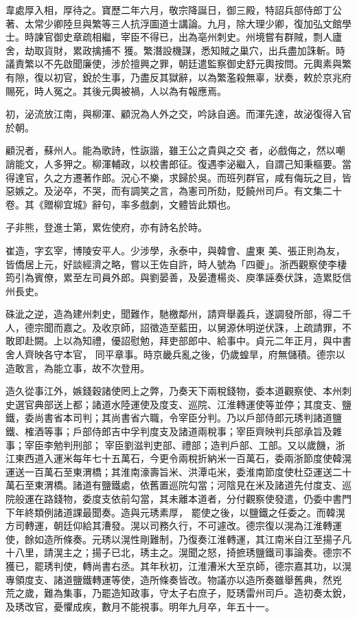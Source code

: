 \begin{pinyinscope}
 韋處厚入相，厚待之。寶歷二年六月，敬宗降誕日，御三殿，特詔兵部侍郎丁公著、太常少卿陸旦與繁等三人抗浮圖道士講論。九月，除大理少卿，復加弘文館學士。時諫官御史章疏相繼，宰臣不得已，出為亳州刺史。州境嘗有群賊，剽人廬舍，劫取貨財，累政擒捕不
 獲。繁潛設機謀，悉知賊之巢穴，出兵盡加誅斬。時議責繁以不先啟聞廉使，涉於擅興之罪，朝廷遣監察御史舒元輿按問。元輿素與繁有隙，復以初官，銳於生事，乃盡反其獄辭，以為繁濫殺無辜，狀奏，敕於京兆府賜死，時人冤之。其後元輿被禍，人以為有報應焉。



 初，泌流放江南，與柳渾、顧況為人外之交，吟詠自適。而渾先達，故泌復得入官於朝。



 顧況者，蘇州人。能為歌詩，性詼諧，雖王公之貴與之交
 者，必戲侮之，然以嘲誚能文，人多狎之。柳渾輔政，以校書郎征。復遇李泌繼入，自謂己知秉樞要。當得達官，久之方遷著作郎。況心不樂，求歸於吳。而班列群官，咸有侮玩之目，皆惡嫉之。及泌卒，不哭，而有調笑之言，為憲司所劾，貶饒州司戶。有文集二十卷。其《贈柳宜城》辭句，率多戲劇，文體皆此類也。



 子非熊，登進士第，累佐使府，亦有詩名於時。



 崔造，字玄宰，博陵安平人。少涉學，永泰中，與韓會、盧東
 美、張正則為友，皆僑居上元，好談經濟之略，嘗以王佐自許，時人號為「四夔」。浙西觀察使李棲筠引為賓僚，累至左司員外郎。與劉晏善，及晏遭楊炎、庾準誣奏伏誅，造累貶信州長史。



 硃泚之逆，造為建州刺史，聞難作，馳檄鄰州，請齊舉義兵，遂調發所部，得二千人，德宗聞而嘉之。及收京師，詔徵造至藍田，以舅源休明逆伏誅，上疏請罪，不敢即赴闕。上以為知禮，優詔慰勉，拜吏部郎中、給事中。貞元二年正月，與中書舍人齊映各守本官，
 同平章事。時京畿兵亂之後，仍歲蝗旱，府無儲積。德宗以造敢言，為能立事，故不次登用。



 造久從事江外，嫉錢穀諸使罔上之弊，乃奏天下兩稅錢物，委本道觀察使、本州刺史選官典部送上都；諸道水陸運使及度支、巡院、江淮轉運使等並停；其度支、鹽鐵，委尚書省本司判；其尚書省六職，令宰臣分判。乃以戶部侍郎元琇判諸道鹽鐵、榷酒等事；戶部侍郎吉中孚判度支及諸道兩稅事；宰臣齊映判兵部承旨及雜事；宰臣李勉判刑部；
 宰臣劉滋判吏部、禮部；造判戶部、工部。又以歲饑，浙江東西道入運米每年七十五萬石，今更令兩稅折納米一百萬石，委兩浙節度使韓滉運送一百萬石至東渭橋；其淮南濠壽旨米、洪潭屯米，委淮南節度使杜亞運送二十萬石至東渭橋。諸道有鹽鐵處，依舊置巡院勾當；河陰見在米及諸道先付度支、巡院般運在路錢物，委度支依前勾當，其未離本道者，分付觀察使發遣，仍委中書門下年終類例諸道課最聞奏。造與元琇素厚，
 罷使之後，以鹽鐵之任委之。而韓滉方司轉運，朝廷仰給其漕發。滉以司務久行，不可遽改。德宗復以滉為江淮轉運使，餘如造所條奏。元琇以滉性剛難制，乃復奏江淮轉運，其江南米自江至揚子凡十八里，請滉主之；揚子已北，琇主之。滉聞之怒，掎摭琇鹽鐵司事論奏。德宗不獲已，罷琇判使，轉尚書右丞。其年秋初，江淮漕米大至京師，德宗嘉其功，以滉專領度支、諸道鹽鐵轉運等使，造所條奏皆改。物議亦以造所奏雖舉舊典，然兇
 荒之歲，難為集事，乃罷造知政事，守太子右庶子，貶琇雷州司戶。造初奏太銳，及琇改官，憂懼成疾，數月不能視事。明年九月卒，年五十一。




\end{pinyinscope}
